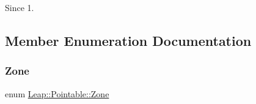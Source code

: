 \begin{DoxySince}{Since}
1. 
\end{DoxySince}


\subsection{Member Enumeration Documentation}
\mbox{\label{class_leap_1_1_pointable_ad6e50b9878b8c1fdf899b5e09721deef}} 
\subsubsection{\texorpdfstring{Zone}{Zone}}
{\footnotesize\ttfamily enum \hyperlink{class_leap_1_1_pointable_ad6e50b9878b8c1fdf899b5e09721deef}{Leap\+::\+Pointable\+::\+Zone}}

